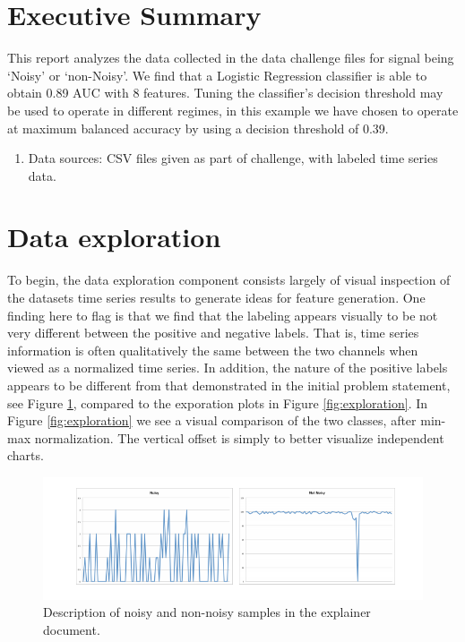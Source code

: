 \documentclass[12pt]{article}
\begin{document}
\tableofcontents
\section{Executive Summary}
This report analyzes the data collected in the data challenge files for signal being `Noisy' or `non-Noisy'. We find that a Logistic Regression classifier is able to obtain 0.89 AUC with 8 features. Tuning the classifier's decision threshold may be used to operate in different regimes, in this example we have chosen to operate at maximum balanced accuracy by using a decision threshold of 0.39.

\begin{enumerate}
\item{Data sources: CSV files given as part of challenge, with labeled time series data. }
\end{enumerate}


\section{Data exploration}
To begin, the data exploration component consists largely of visual inspection of the datasets time series results to generate ideas for feature generation. One finding here to flag is that we find that the labeling appears visually to be not very different between the positive and negative labels. That is, time series information is often qualitatively the same between the two channels when viewed as a normalized time series. In addition, the nature of the positive labels appears to be different from that demonstrated in the initial problem statement, see Figure \ref{fig:spikes}, compared to the exporation plots in Figure \ref{fig:exploration}. In Figure \ref{fig:exploration} we see a visual comparison of the two classes, after min-max normalization. The vertical offset is simply to better visualize independent charts. 

\clearpage

\begin{figure}
\centering
\includegraphics[width=1\textwidth]{spikes.png}
\caption{Description of noisy and non-noisy samples in the explainer document. }
\label{fig:spikes}
\end{figure}
\end{document}
